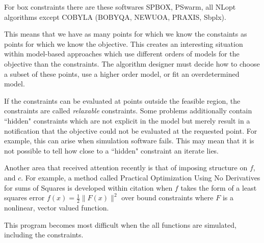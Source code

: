 





For box constraints there are these softwares
SPBOX, PSwarm, all NLopt algorithms except COBYLA (BOBYQA, NEWUOA, PRAXIS, Sbplx).



This means that we have as many points for which we know the constaints as points for which we know the objective.
This creates an interesting situation within model-based approaches which use different orders of models for the objective than the constraints.
The algorithm designer must decide how to choose a subset of these points, use a higher order model, or fit an overdetermined model.

If the constraints can be evaluated at points outside the feasible region, the constraints are called \emph{relaxable} constraints.
Some problems additionally contain ``hidden" constraints which are not explicit in the model but merely result in a notification that the objective could not be evaluated at the requested point.
For example, this can arise when simulation software fails.
This may mean that it is not possible to tell how close to a ``hidden" constraint an iterate lies.


Another area that received attention recently is that of imposing structure on $f$, and $c$.
For example, a method called Practical Optimization Using No Derivatives for sums of Squares
is developed within \color{red}citation\color{black} %
when $f$ takes the form of a least squares error
$f(x) = \frac 1 2 \|F(x)\|^2$ over bound constraints where $F$ is a nonlinear, vector valued function.


This program becomes most difficult when the all functions are simulated, including the constraints.




